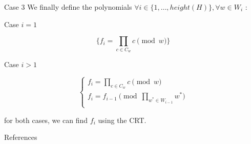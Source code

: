 \documentclass{beamer}
\begin{document}
\begin{frame}{Case 3}
    We finally define the polynomials $\forall i \in \{1,\dots,height(H)\}, \forall w \in W_{i}$ :

Case $i = 1$

\[\{ f_{i} = \prod_{c \in C_{w} } c \pmod w \}\]

Case $i > 1$

\begin{displaymath}
    \left\{
    \begin{array}{ll}
    f_{i} = \prod_{c \in C_{w} } c \pmod w \\
    f_{i} = f_{i-1} \pmod{\prod_{w^{*} \in W_{i-1}} w^{*}}\\
    \end{array}
    \right.
\end{displaymath}

for both cases, we can find $f_{i}$ using the CRT\@.
\end{frame}




\begin{frame}{References}
    \nocite{*}
    \printbibliography
\end{frame}
\end{document}
